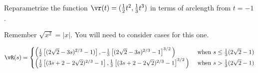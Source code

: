 \begin{question}
Reparametrize the function $\vr(t)=(\tfrac12 t^2 , \tfrac13 t^3)$ in terms of arclength from $t=-1$.
\end{question}
\begin{hint}
Remember $\sqrt{x^2}=|x|$. You will need to consider cases for this one.
\end{hint}
\begin{answer}
$\vR(s)=\begin{cases}
\Big(\frac12\left[ (2\sqrt2-3s)^{2/3}-1)\right],-\frac13\left[(2\sqrt2-3s)^{2/3}-1\right]^{3/2}\Big)&\text{ when }s\le \frac13(2\sqrt2-1)\\
\Big(\frac12\left[(3s+2-2\sqrt2)^{2/3}-1 \right],\frac13\left[(3s+2-2\sqrt2)^{2/3}-1\right]^{3/2}\Big)&\text{ when }s>\frac13(2\sqrt2-1)
\end{cases}
$
\end{answer}
